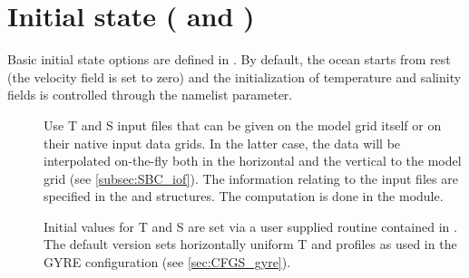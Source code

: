 \documentclass[../main/NEMO_manual]{subfiles}
\begin{document}
\section[Initial state (\textit{istate.F90} and \textit{dtatsd.F90})]{Initial state (\protect{} and \protect{})}
\label{sec:DOM_DTA_tsd}

\begin{listing}
  \caption{}
  \label{lst:namtsd}
\end{listing}

Basic initial state options are defined in .
By default, the ocean starts from rest (the velocity field is set to zero) and
the initialization of temperature and salinity fields is controlled through the  namelist parameter.

\begin{description}
\item [{}] Use T and S input files that can be given on
  the model grid itself or on their native input data grids.
  In the latter case,
  the data will be interpolated on-the-fly both in the horizontal and the vertical to the model grid
  (see \autoref{subsec:SBC_iof}).
  The information relating to the input files are specified in
  the  and  structures.
  The computation is done in the  module.
\item [{}] Initial values for T and S are set via
  a user supplied  routine contained in .
  The default version sets horizontally uniform T and profiles as used in the GYRE configuration
  (see \autoref{sec:CFGS_gyre}).
\end{description}

\subinc{}
\end{document}
